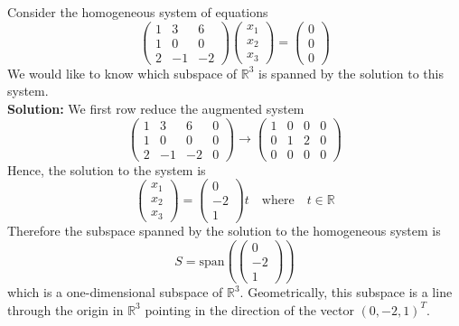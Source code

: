\begin{example}
    Consider the homogeneous system of equations 
    \[ \begin{pmatrix} 1 & 3 & 6 \\ 1 & 0 & 0 \\ 2 & -1 & -2 \end{pmatrix} \begin{pmatrix}
        x_1 \\ x_2 \\ x_3 \end{pmatrix} = \begin{pmatrix} 0 \\ 0 \\ 0 \end{pmatrix} \]
    We would like to know which subspace of $\mathbb{R}^3$ is spanned by the solution to
    this system. \\
    {\bf Solution: } We first row reduce the augmented system
    \[ \left( \begin{array}{ccc|c} 1 & 3 & 6 & 0 \\ 1 & 0 & 0 & 0 \\ 2 & -1 & -2 & 0
        \end{array} \right)  \to
    \left( \begin{array}{ccc|c} 1 & 0 & 0 &0 \\ 0 & 1 & 2& 0  \\ 0 & 0 & 0 & 0 \end{array}\right) \]
    Hence, the solution to the system is
    \[ \begin{pmatrix} x_1 \\ x_2 \\ x_3 \end{pmatrix} = \begin{pmatrix} 0 \\ -2 \\ 1
    \end{pmatrix} t \quad \text{where} \quad t \in \mathbb{R} \]
    Therefore the subspace spanned by the solution to the homogeneous system is
    \[ S = \text{span}\left( \begin{pmatrix} 0\\-2\\1\end{pmatrix} \right) \]
    which is a one-dimensional subspace of $\mathbb{R}^3$.  Geometrically, this subspace
    is a line through the origin in $\mathbb{R}^3$ pointing in the direction of the vector
    $(0,-2,1)^T$.
\end{example}


